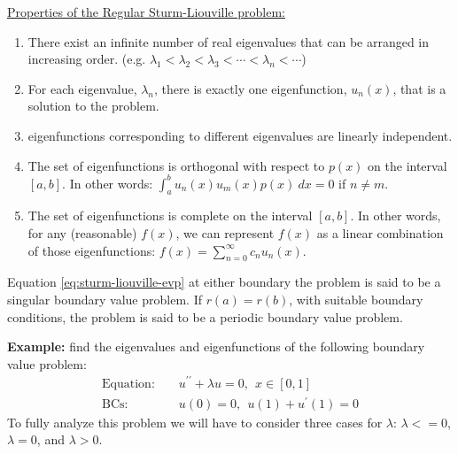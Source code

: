 \vspace{0.5cm}

\noindent\underline{Properties of the Regular Sturm-Liouville problem:}
\begin{enumerate}
\item There exist an infinite number of real eigenvalues that can be arranged in increasing order. (e.g. $\lambda_1 < \lambda_2 < \lambda_3 < \cdots < \lambda_n < \cdots$)
\item For each eigenvalue, $\lambda_n$, there is exactly one eigenfunction, $u_n(x)$, that is a solution to the problem.

\item eigenfunctions corresponding to different eigenvalues are linearly independent.

\item The set of eigenfunctions is orthogonal with respect to $p(x)$ on the interval $[a,b]$.  In other words: $\int_{a}^{b}u_n(x) u_m(x) p(x) \ dx = 0$ if $n \ne m$.

\item The set of eigenfunctions is complete on the interval $[a,b]$.  In other words, for any (reasonable) $f(x)$, we can represent $f(x)$ as a linear combination of those eigenfunctions: $f(x) = \sum_{n=0}^{\infty} c_n u_n(x)$.
\end{enumerate}


 Equation \ref{eq:sturm-liouville-evp} at either boundary the problem is said to be a singular boundary value problem.  If $r(a) = r(b)$, with suitable boundary conditions, the problem is said to be a periodic boundary value problem.

\vspace{1.0cm}

\noindent\textbf{Example:} find the eigenvalues and eigenfunctions of the following boundary value problem:
\begin{align*}
\text{Equation: }& & u^{\prime \prime}+\lambda u = 0,  \ \ x\in[0,1] \\
\text{BCs: }& & u(0) = 0, \ \ u(1) + u^{\prime}(1) = 0
\end{align*}
To fully analyze this problem we will have to consider three cases for $\lambda$: $\lambda < =0$, $\lambda = 0$, and $\lambda > 0$.

